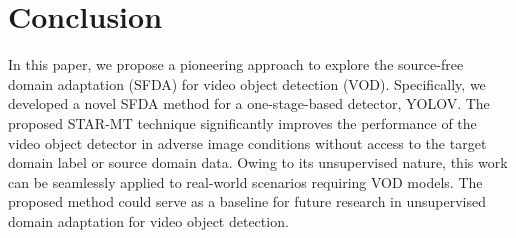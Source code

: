 \section{Conclusion}

In this paper, we propose a pioneering approach to explore the source-free domain adaptation (SFDA) for video object detection (VOD). Specifically, we developed a novel SFDA method for a one-stage-based detector, YOLOV. The proposed STAR-MT technique significantly improves the performance of the video object detector in adverse image conditions without access to the target domain label or source domain data. Owing to its unsupervised nature, this work can be seamlessly applied to real-world scenarios requiring VOD models. The proposed method could serve as a baseline for future research in unsupervised domain adaptation for video object detection. 

